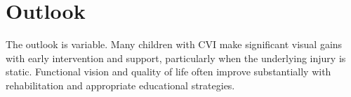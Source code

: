 \section{Outlook}
The outlook is variable. Many children with CVI make significant visual gains with early intervention and support, particularly when the underlying injury is static. Functional vision and quality of life often improve substantially with rehabilitation and appropriate educational strategies.
